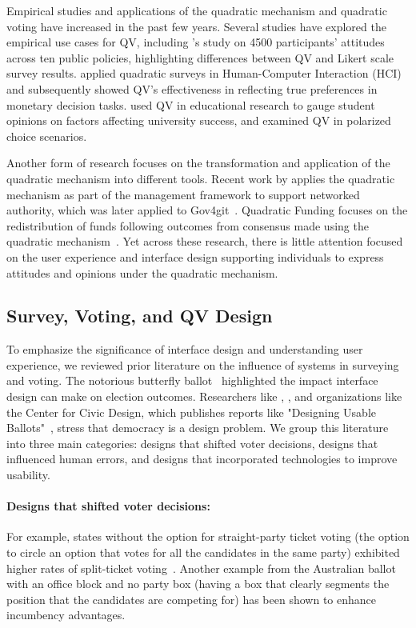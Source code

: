 Empirical studies and applications of the quadratic mechanism and quadratic voting have increased in the past few years. Several studies have explored the empirical use cases for QV, including \textcite{quarfoot2017quadratic}'s study on 4500 participants' attitudes across ten public policies, highlighting differences between QV and Likert scale survey results. \textcite{chengCanShowWhat2021} applied quadratic surveys in Human-Computer Interaction (HCI) and subsequently showed QV's effectiveness in reflecting true preferences in monetary decision tasks. \textcite{naylor2017first} used QV in educational research to gauge student opinions on factors affecting university success, and \textcite{cavailleWhoCaresMeasuring} examined QV in polarized choice scenarios.

Another form of research focuses on the transformation and application of the quadratic mechanism into different tools. Recent work by \textcite{southPluralManagement2024} applies the quadratic mechanism as part of the management framework to support networked authority, which was later applied to Gov4git~\cite{Gov4gitDecentralizedPlatform2023}. Quadratic Funding focuses on the redistribution of funds following outcomes from consensus made using the quadratic mechanism~\cite{buterinFlexibleDesignFunding2019a, freitasQuadraticFundingIncomplete2024}. Yet across these research, there is little attention focused on the user experience and interface design supporting individuals to express attitudes and opinions under the quadratic mechanism.

\subsection{Survey, Voting, and QV Design}
To emphasize the significance of interface design and understanding user experience, we reviewed prior literature on the influence of systems in surveying and voting. The notorious butterfly ballot~\cite{wandButterflyDidIt2001} highlighted the impact interface design can make on election outcomes. Researchers like \textcite{engstrom2020politics}, \textcite{chisnellDemocracyDesignProblem2016}, and organizations like the Center for Civic Design, which publishes reports like "Designing Usable Ballots"~\cite{DesigningUsableBallots2015}, stress that democracy is a design problem. We group this literature into three main categories: designs that shifted voter decisions, designs that influenced human errors, and designs that incorporated technologies to improve usability.
\paragraph{Designs that shifted voter decisions: } For example, states without the option for straight-party ticket voting (the option to circle an option that votes for all the candidates in the same party) exhibited higher rates of split-ticket voting~\cite{engstrom2020politics}. Another example from the Australian ballot with an office block and no party box (having a box that clearly segments the position that the candidates are competing for) has been shown to enhance incumbency advantages.
